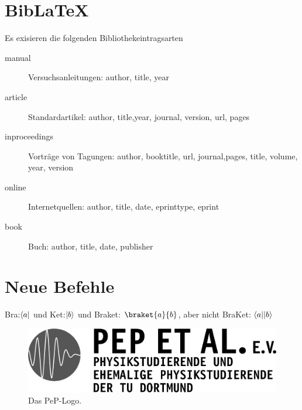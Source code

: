 \documentclass[parskip=half, titlepage=firstiscover, captions=tableheading,bibliography=totoc,]{scrartcl}
\DeclarePairedDelimiter{\bra}{\langle}{\rvert}
\DeclarePairedDelimiter{\ket}{\rvert}{\rangle}
\begin{document}
\section{Bib\LaTeX}

Es exisieren die folgenden Bibliothekeintragsarten
\begin{description}
	\item[manual] Versuchsanleitungen: author, title, year
	\item[article] Standardartikel: author, title,year, journal, version, url, pages
	\item[inproceedings] Vorträge von Tagungen: author, booktitle, url, journal,pages, title, volume, year, version
	\item[online] Internetquellen: author, title, date, eprinttype, eprint
	\item[book]  Buch: author, title, date, publisher
\end{description}
\nocite{*}
\printbibliography


\section{Neue Befehle}

Bra:$\bra{a}$ 
und Ket:$\ket{b}$
und Braket: $\braket{a}{b}$, 
aber nicht BraKet: $\bra{a}\ket{b}$ 
\begin{landscape}
	\begin{figure}[p]
	\centering
	\includegraphics[width=\textwidth]{Pictures/peplogox.png}
	\caption{Das PeP-Logo.}
\end{figure}
\end{landscape}
\end{document}
